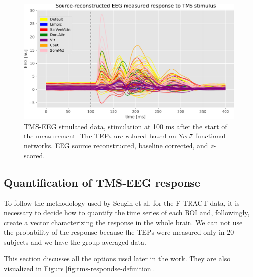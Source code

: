 \begin{figure}
    \centering
    \includegraphics[width=\textwidth]{images/nootebook_generated/pytepfit_results/simulated/200/not_over_threshold_nan/data.pdf}
    \caption[TMS-EEG simulated data]{TMS-EEG simulated data, stimulation at 100 ms after the start of the measurement. The TEPs are colored based on Yeo7 functional networks. EEG source reconstructed, baseline corrected, and $z$-scored.}
    \label{fig:tms-simulated-data}
\end{figure}

\subsection{Quantification of TMS-EEG response}

To follow the methodology used by Seugin et al. for the F-TRACT data, it is necessary to decide how to quantify the time series of each ROI and, followingly, create a vector characterizing the response in the whole brain. We can not use the probability of the response because the TEPs were measured only in 20 subjects and we have the group-averaged data.

This section discusses all the options used later in the work. They are also visualized in Figure \ref{fig:tms-respondse-definition}.

